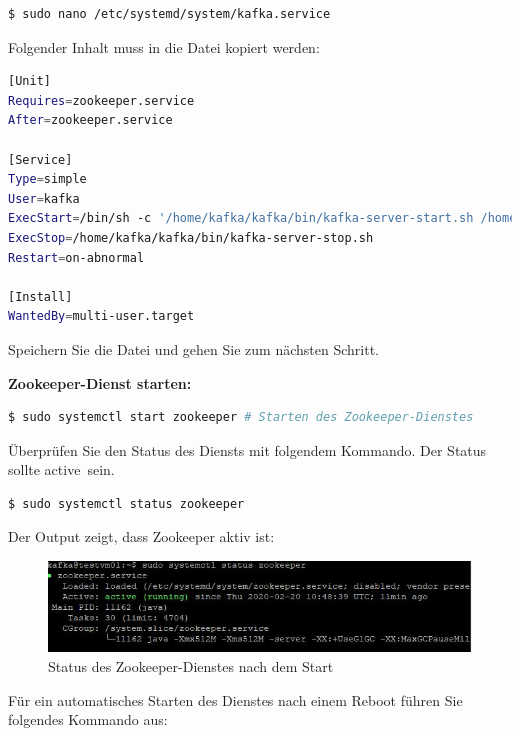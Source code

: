 \documentclass[a4paper,titlepage,halfparskip,12pt]{scrreprt}
\begin{document}
\begin{onehalfspacing}
\begin{lstlisting}[language=Bash]
$ sudo nano /etc/systemd/system/kafka.service
\end{lstlisting}

Folgender Inhalt muss in die Datei kopiert werden:

\smallskip

\begin{lstlisting}[language=Bash]
[Unit]
Requires=zookeeper.service
After=zookeeper.service

[Service]
Type=simple
User=kafka
ExecStart=/bin/sh -c '/home/kafka/kafka/bin/kafka-server-start.sh /home/kafka/kafka/config/server.properties > /home/kafka/kafka/kafka.log 2>&1'
ExecStop=/home/kafka/kafka/bin/kafka-server-stop.sh
Restart=on-abnormal

[Install]
WantedBy=multi-user.target
\end{lstlisting}

Speichern Sie die Datei und gehen Sie zum nächsten Schritt.

\textbf{Zookeeper-Dienst starten:}

\bigskip

\begin{lstlisting}[language=Bash]
$ sudo systemctl start zookeeper # Starten des Zookeeper-Dienstes
\end{lstlisting}

Überprüfen Sie den Status des Diensts mit folgendem Kommando. Der Status sollte \glqq active\grqq\ sein.

\smallskip

\begin{lstlisting}[language=Bash]
$ sudo systemctl status zookeeper
\end{lstlisting}

Der Output zeigt, dass Zookeeper aktiv ist:

\begin{figure}[h]
	\centering
	\includegraphics{images/StatusZookeeper}
	\caption{Status des Zookeeper-Dienstes nach dem Start}
	\label{img:StatusZookeeper}
\end{figure}

Für ein automatisches Starten des Dienstes nach einem Reboot führen Sie folgendes Kommando aus:


\end{onehalfspacing}
\end{document}
